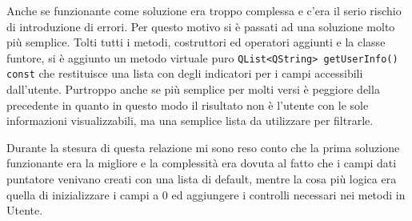 \documentclass[a4paper,openany]{article}
\begin{document}
Anche se funzionante come soluzione era troppo complessa e c'era il serio rischio di introduzione di errori. Per questo motivo si è passati ad una soluzione molto più semplice. Tolti tutti i metodi, costruttori ed operatori aggiunti e la classe funtore, si è aggiunto un metodo virtuale puro \texttt{QList<QString> getUserInfo() const} che restituisce una lista con degli indicatori per i campi accessibili dall'utente. Purtroppo anche se più semplice per molti versi è peggiore della precedente in quanto in questo modo il risultato non è l'utente con le sole informazioni visualizzabili, ma una semplice lista da utilizzare per filtrarle.

Durante la stesura di questa relazione mi sono reso conto che la prima soluzione funzionante era la migliore e la complessità era dovuta al fatto che i campi dati puntatore venivano creati con una lista di default, mentre la cosa più logica era quella di inizializzare i campi a 0 ed aggiungere i controlli necessari nei metodi in Utente.
 
\subsection*{} 
\end{document}
